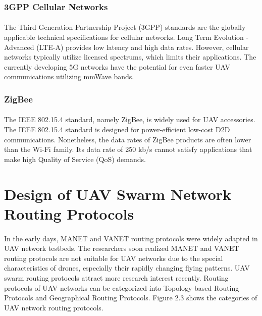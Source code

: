 \documentclass[a4paper,12pt]{report}
\begin{document}
\subsubsection{3GPP Cellular Networks}
\paragraph{}
The Third Generation Partnership Project (3GPP) standards are the globally applicable technical specifications for cellular networks. Long Term Evolution - Advanced (LTE-A) provides low latency and high data rates. However, cellular networks typically utilize licensed spectrums, which limits their applications\cite{chen2020toward}. The currently developing 5G networks have the potential for even faster UAV communications utilizing mmWave bands.

\subsubsection{ZigBee}
\paragraph{}
The IEEE 802.15.4 standard, namely ZigBee, is widely used for UAV accessories. The IEEE 802.15.4 standard is designed for power-efficient low-cost D2D communications\cite{Shi_2021}. Nonetheless, the data rates of ZigBee products are often lower than the Wi-Fi family. Its data rate of 250 kb/s cannot satisfy applications that make high Quality of Service (QoS) demands.

\section{Design of UAV Swarm Network Routing Protocols}

\paragraph{}
In the early days, MANET and VANET routing protocols were widely adapted in UAV network testbeds\cite{8772093}. The researchers soon realized MANET and VANET routing protocols are not suitable for UAV networks due to the special characteristics of drones, especially their rapidly changing flying patterns. UAV swarm routing protocols attract more research interest recently. Routing protocols of UAV networks can be categorized into Topology-based Routing Protocols and Geographical Routing Protocols\cite{8772093}. Figure 2.3 shows the categories of UAV network routing protocols.
\end{document}
